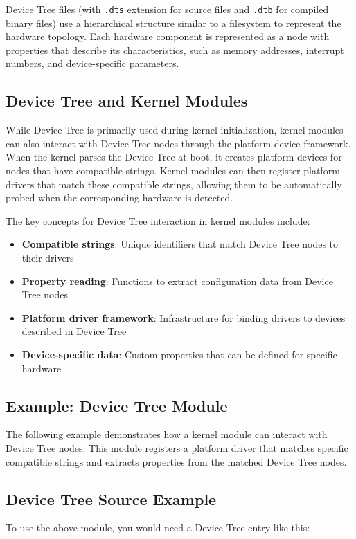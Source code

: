 \documentclass[10pt, oneside]{book}
\begin{document}
Device Tree files (with \verb|.dts| extension for source files and \verb|.dtb| for compiled binary files) use a hierarchical structure similar to a filesystem to represent the hardware topology.
Each hardware component is represented as a node with properties that describe its characteristics,
such as memory addresses, interrupt numbers, and device-specific parameters.

\subsection{Device Tree and Kernel Modules}
\label{sec:dt_modules}
While Device Tree is primarily used during kernel initialization, kernel modules can also interact with Device Tree nodes through the platform device framework.
When the kernel parses the Device Tree at boot, it creates platform devices for nodes that have compatible strings.
Kernel modules can then register platform drivers that match these compatible strings, allowing them to be automatically probed when the corresponding hardware is detected.

The key concepts for Device Tree interaction in kernel modules include:
\begin{itemize}
\item \textbf{Compatible strings}: Unique identifiers that match Device Tree nodes to their drivers
\item \textbf{Property reading}: Functions to extract configuration data from Device Tree nodes
\item \textbf{Platform driver framework}: Infrastructure for binding drivers to devices described in Device Tree
\item \textbf{Device-specific data}: Custom properties that can be defined for specific hardware
\end{itemize}

\subsection{Example: Device Tree Module}
\label{sec:dt_example}
The following example demonstrates how a kernel module can interact with Device Tree nodes.
This module registers a platform driver that matches specific compatible strings and extracts properties from the matched Device Tree nodes.


\subsection{Device Tree Source Example}
\label{sec:dt_source}
To use the above module, you would need a Device Tree entry like this:
\end{document}
